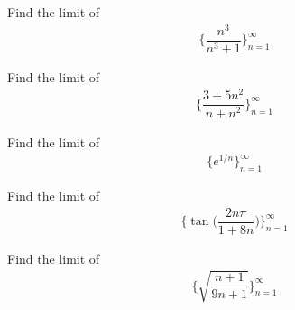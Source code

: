 \begin{exercise}
Find the limit of 
\begin{align*}
    \Big\{\dfrac{n^{3}}{n^{3}+1}\Big\}_{n=1}^{\infty}
\end{align*}
\end{exercise}

\begin{exercise}
Find the limit of 
\begin{align*}
    \Big\{\dfrac{3+5n^{2}}{n+n^{2}}\Big\}_{n=1}^{\infty}
\end{align*}
\end{exercise}

\begin{exercise}
Find the limit of 
\begin{align*}
    \{e^{1/n}\}_{n=1}^{\infty}
\end{align*}
\end{exercise}

\begin{exercise}
Find the limit of
\begin{align*}
    \Big\{\tan\Big(\dfrac{2n\pi}{1+8n}\Big)\Big\}_{n=1}^{\infty}
\end{align*}
\end{exercise}

\begin{exercise}
Find the limit of
\begin{align*}
    \Big\{\sqrt{\dfrac{n+1}{9n+1}}\Big\}_{n=1}^{\infty}
\end{align*}
\end{exercise}

